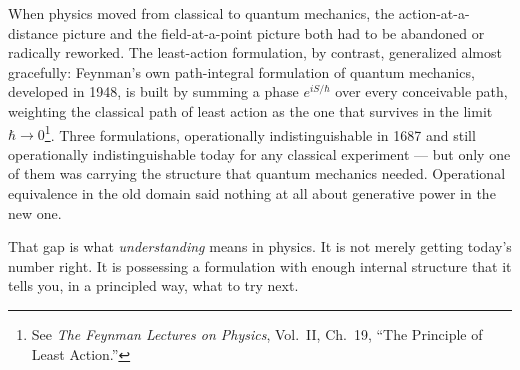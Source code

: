 \documentclass[12pt]{book}
\begin{document}
When physics moved from classical to quantum mechanics, the action-at-a-distance picture and the field-at-a-point picture both had to be abandoned or radically reworked. The least-action formulation, by contrast, generalized almost gracefully: Feynman's own path-integral formulation of quantum mechanics, developed in 1948, is built by summing a phase $e^{iS/\hbar}$ over every conceivable path, weighting the classical path of least action as the one that survives in the limit $\hbar \to 0$\footnote{See \emph{The Feynman Lectures on Physics}, Vol.~II, Ch.~19, ``The Principle of Least Action.''}. Three formulations, operationally indistinguishable in 1687 and still operationally indistinguishable today for any classical experiment --- but only one of them was carrying the structure that quantum mechanics needed. Operational equivalence in the old domain said nothing at all about generative power in the new one.

That gap is what \emph{understanding} means in physics. It is not merely getting today's number right. It is possessing a formulation with enough internal structure that it tells you, in a principled way, what to try next.
\end{document}
